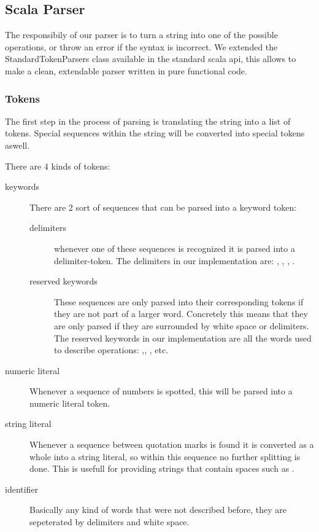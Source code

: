 \subsection{Scala Parser}

The responsibily of our parser is to turn a string into one of the possible
operations, or throw an error if the syntax is incorrect. We extended the
StandardTokenParsers class available in the standard scala api, this allows to
make a clean, extendable parser written in pure functional code.

\subsubsection{Tokens} 

The first step in the process of parsing is translating the string into a list
of tokens. Special sequences within the string will be converted into special
tokens aswell.

\par
There are 4 kinds of tokens:
\begin{description} 
\item[keywords] There are 2 sort of sequences that can be parsed into a keyword
token:
	\begin{description}
	\item[delimiters] whenever one of these sequences is recognized it is parsed
	into a delimiter-token. The delimiters in our implementation are: \sn{\{},
	\sn{\}}, \sn{,}, \sn{:}.
	\item[reserved keywords] These sequences are only parsed into their
	corresponding tokens if they are not part of a larger word. Concretely this
	means that they are only parsed if they are surrounded by white space or
	delimiters. The reserved keywords in our implementation are all the words used
	to describe operations: ,, , etc.
	\end{description}
\item[numeric literal] Whenever a sequence of numbers is spotted, this will be
parsed into a numeric literal token.
\item[string literal] Whenever a sequence between quotation marks is found it is
converted as a whole into a string literal, so within this sequence no further
splitting is done. This is usefull for providing strings that contain spaces
such as .
\item[identifier] Basically any kind of words that were not described before,
they are sepeterated by delimiters and white space.
\end{description}
	
